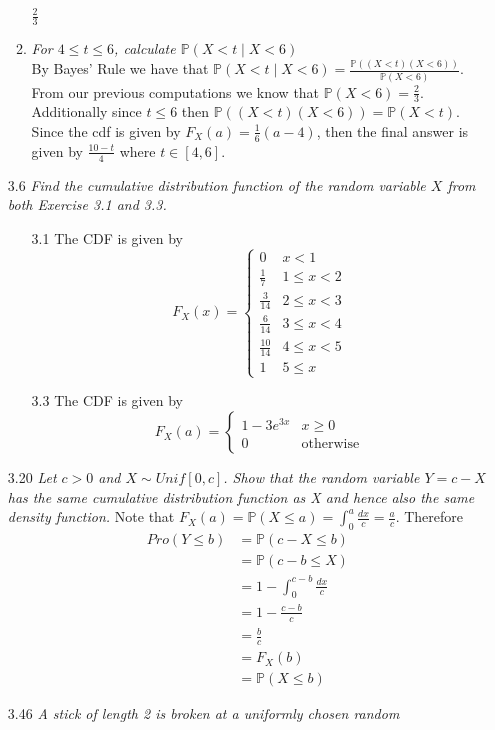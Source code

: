 \documentclass[12pt, letterpaper]{article}
\newcommand{\Pro}{\mathbb{P}}
\begin{document}
\begin{enumerate}
\begin{enumerate}
		$\frac{2}{3}$
		\item \textit{For $4 \leq t \leq 6$, calculate $\Pro(X<t \mid X <6)$}\\
		By Bayes' Rule we have that $\Pro(X<t \mid X <6) = \frac{\Pro((X<t )( X <6))}{\Pro(X < 6)}$.  From our previous computations we know that
		$\Pro(X < 6) = \frac{2}{3}$.  Additionally since $t \leq 6$ then  
		$\Pro((X<t )( X <6)) = \Pro(X<t)$.  Since the cdf is given by 
		$F_X(a) = \frac{1}{6}(a-4)$, then the final answer is given by $\frac{10-t}{4}$ where $t \in [4,6]$. 
	\end{enumerate}
	\item[3.6] \textit{Find the cumulative distribution function of the random variable
$X$ from both Exercise 3.1 and 3.3.}
	\begin{enumerate}
		\item[3.1] The CDF is given by 
		$$
		F_X(x) = \begin{cases}
			0 & x < 1\\
			\frac{1}{7} & 1 \leq x < 2\\
			\frac{3}{14} & 2 \leq x < 3\\
			\frac{6}{14} & 3 \leq x < 4\\
			\frac{10}{14} & 4 \leq x < 5\\
			1 & 5\leq x
		\end{cases}
		$$
		\item[3.3] The CDF is given by
		$$
		F_X(a)  = \begin{cases}
		1-3e^{3x}& x \geq 0\\
		0 & \text{otherwise}
		\end{cases}
		$$
	\end{enumerate}
	\item[3.20] \textit{Let $c > 0$ and $X \sim Unif[0, c]$. Show that the random variable
$Y = c - X$ has the same cumulative distribution function as X and hence also
the same density function.}
	Note that $F_X(a) = \Pro(X\leq a) = \int_{0}^a \frac{dx}{c} = \frac{a}{c}$.
	Therefore \begin{align*}
	Pro(Y \leq b) &= \Pro(c-X\leq b)\\
	 &= \Pro(c-b \leq X)\\ 
	 &=	1- \int_{0}^{c-b} \frac{dx}{c}\\
	 &= 1 - \frac{c-b}{c}\\
	 &= \frac{b}{c}\\
	 &= F_X(b)\\
	 &= \Pro(X\leq b)
	\end{align*}
	\item[3.46] \textit{A stick of length 2 is broken at a uniformly chosen random
}
\end{enumerate}
\end{document}
